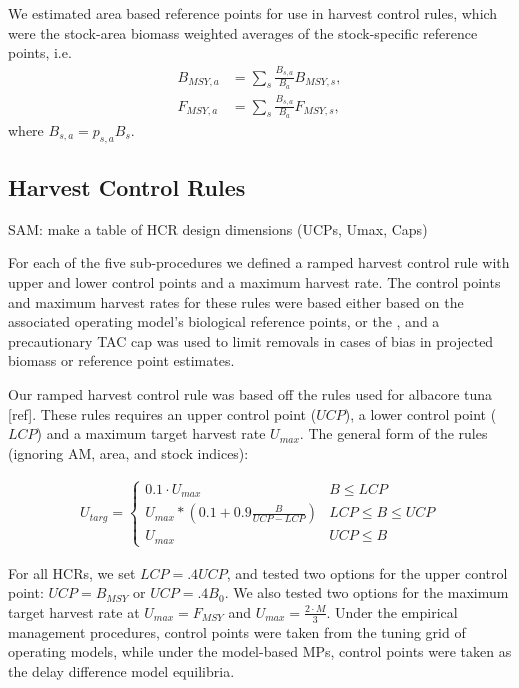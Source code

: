 \documentclass[]{article}
\begin{document}
We estimated area based reference points for use in harvest control
rules, which were the stock-area biomass weighted averages of
the stock-specific reference points, i.e.
\begin{align}
B_{MSY,a} & = \sum_{s} \frac{B_{s,a}}{B_a} B_{MSY,s}, \\
F_{MSY,a} & = \sum_{s} \frac{B_{s,a}}{B_a} F_{MSY,s},
\end{align}
where \(B_{s,a} = p_{s,a} B_s\).

\hypertarget{harvest-control-rules}{%
\subsection{Harvest Control Rules}\label{harvest-control-rules}}

SAM: make a table of HCR design dimensions (UCPs, Umax, Caps)

For each of the five sub-procedures we defined a ramped harvest
control rule with upper and lower control points and a maximum harvest
rate. The control points and maximum harvest rates for these rules were
based either based on the associated operating model's biological reference
points, or the , and a precautionary TAC cap was used to limit removals in
cases of bias in projected biomass or reference point estimates.

Our ramped harvest control rule was based off the rules used for
albacore tuna {[}ref{]}. These rules requires an upper control point (\(UCP\)),
a lower control point (\(LCP\)) and a maximum target harvest rate \(U_{max}\).
The general form of the rules (ignoring AM, area, and stock indices):

\begin{align}
U_{targ} =  \left\{\begin{array}{ll} 
                0.1 \cdot U_{max} & B \leq LCP \\
                U_{max} * (0.1  + 0.9 \frac{B}{UCP - LCP} ) & LCP \leq B \leq UCP \\
                U_{max} & UCP \leq B 
            \end{array} \right.
\end{align}

For all HCRs, we set \(LCP = .4 UCP\), and tested two options for the
upper control point: \(UCP = B_{MSY}\) or \(UCP = .4 B_0\). We also tested
two options for the maximum target harvest rate at \(U_{max} = F_{MSY}\)
and \(U_{max} = \frac{2\cdot M}{3}\). Under the empirical management
procedures, control points were taken from the tuning
grid of operating models, while under the model-based MPs,
control points were taken as the delay difference model
equilibria.
\end{document}
